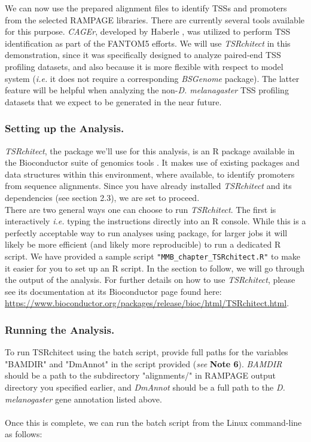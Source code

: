 \documentclass[runningheads,a4paper]{llncs}
\begin{document}
\begin{linenumbers}
We can now use the prepared alignment files to identify TSSs and promoters from the selected RAMPAGE libraries.
There are currently several tools available for this purpose.
\textit{CAGEr}, developed by Haberle \cite{Haberle:2015fp}, was utilized to perform TSS identification as part of the FANTOM5 efforts.
We will use \textit{TSRchitect} in this demonstration, since it was specifically designed to analyze paired-end TSS profiling datasets, and also because it is more flexible with respect to model system (\textit{i.e.} it does not require a corresponding \textit{BSGenome} package).
The latter feature will be helpful when analyzing the non-\textit{D. melanagaster} TSS profiling datasets that we expect to be generated in the near future.

\subsubsection{Setting up the Analysis.}
\textit{TSRchitect}, the package we'll use for this analysis, is an R package available in the Bioconductor suite of genomics tools \cite{Lawrence:2014gy}.
It makes use of existing packages and data structures within this environment, where available, to identify promoters from sequence alignments.
Since you have already installed \textit{TSRchitect} and its dependencies (see section 2.3), we are set to proceed.\\
\indent
There are two general ways one can choose to run \textit{TSRchitect}. 
The first is interactively \textit{i.e.} typing the instructions directly into an R console.
While this is a perfectly acceptable way to run analyses using package, for larger jobs it will likely be more efficient (and likely more reproducible) to run a dedicated R script.
We have provided a sample script \texttt{"MMB\_chapter\_TSRchitect.R"} to make it easier for you to set up an R script. 
In the section to follow, we will go through the output of the analysis. 
For further details on how to use \textit{TSRchitect}, please see its documentation at its Bioconductor page found here: \url{https://www.bioconductor.org/packages/release/bioc/html/TSRchitect.html}.\\

\subsubsection{Running the Analysis.}
To run TSRchitect using the batch script, provide full paths for the variables "BAMDIR" and "DmAnnot" in the script provided (\textit{see} \textbf{Note 6}).
\textit{BAMDIR} should be a path to the subdirectory "alignments/" in RAMPAGE output directory you specified earlier, and \textit{DmAnnot} should be a full path to the \textit{D. melanogaster} gene annotation listed above.\\
\\
Once this is complete, we can run the batch script from the Linux command-line as follows:


\end{linenumbers}
\end{document}
